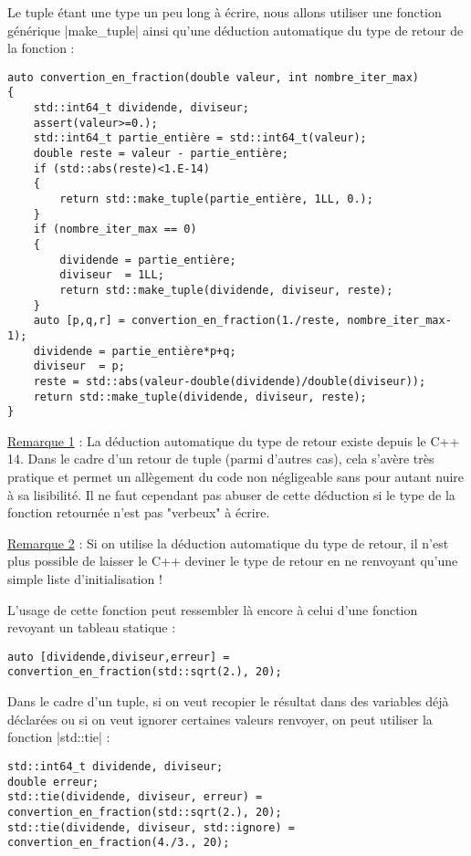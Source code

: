 \begin{itemize}
Le tuple étant une type un peu long à écrire, nous allons utiliser une fonction générique |make_tuple|
ainsi qu'une déduction automatique du type de retour de la fonction :
\begin{lstlisting}
auto convertion_en_fraction(double valeur, int nombre_iter_max)
{
    std::int64_t dividende, diviseur;
    assert(valeur>=0.);
    std::int64_t partie_entière = std::int64_t(valeur);
    double reste = valeur - partie_entière;
    if (std::abs(reste)<1.E-14)
    {
        return std::make_tuple(partie_entière, 1LL, 0.);
    }
    if (nombre_iter_max == 0)
    {
        dividende = partie_entière;
        diviseur  = 1LL;
        return std::make_tuple(dividende, diviseur, reste);
    }
    auto [p,q,r] = convertion_en_fraction(1./reste, nombre_iter_max-1);
    dividende = partie_entière*p+q;
    diviseur  = p;
    reste = std::abs(valeur-double(dividende)/double(diviseur));
    return std::make_tuple(dividende, diviseur, reste);
}
\end{lstlisting}

\underline{Remarque 1} : La déduction automatique du type de retour existe depuis le C++ 14. Dans le cadre
d'un retour de tuple (parmi d'autres cas), cela s'avère très pratique et permet un allègement du code
non négligeable sans pour autant nuire à sa lisibilité. Il ne faut cependant pas abuser de cette déduction
si le type de la fonction retournée n'est pas "verbeux" à écrire.

\underline{Remarque 2} : Si on utilise la déduction automatique du type de retour, il n'est plus possible
de laisser le C++ deviner le type de retour en ne renvoyant qu'une simple liste d'initialisation !

L'usage de cette fonction peut ressembler là encore à celui d'une fonction revoyant un tableau statique :
\begin{lstlisting}
auto [dividende,diviseur,erreur] = convertion_en_fraction(std::sqrt(2.), 20);
\end{lstlisting}

Dans le cadre d'un tuple, si on veut recopier le résultat dans des variables déjà déclarées
ou si on veut ignorer certaines valeurs renvoyer, on peut utiliser la fonction |std::tie| :
\begin{lstlisting}
std::int64_t dividende, diviseur;
double erreur;
std::tie(dividende, diviseur, erreur) = convertion_en_fraction(std::sqrt(2.), 20);
std::tie(dividende, diviseur, std::ignore) = convertion_en_fraction(4./3., 20);
\end{lstlisting}


\end{itemize}
